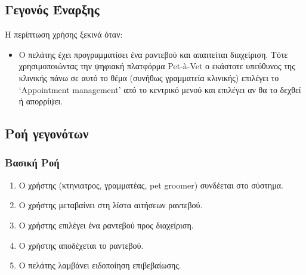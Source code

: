 \documentclass[12pt,a4paper,twoside]{book}
\begin{document}
\subsection{Γεγονός Έναρξης}
Η περίπτωση χρήσης ξεκινά όταν:
\begin{itemize}
  \item Ο πελάτης έχει προγραμματίσει ένα ραντεβού και απαιτείται διαχείριση. Τότε χρησιμοποιώντας την ψηφιακή πλατφόρμα  Pet-à-Vet ο εκάστοτε υπεύθυνος της κλινικής πάνω σε αυτό το θέμα (συνήθως γραμματεία κλινικής) επιλέγει το ‘Appointment management’ από το κεντρικό μενού και επιλέγει αν θα το δεχθεί ή απορρίψει. %
\end{itemize}

\subsection{Ροή γεγονότων}

\subsubsection{Βασική Ροή}
\begin{enumerate}
  \item Ο χρήστης (κτηνιατρος, γραμματέας, pet groomer) συνδέεται στο σύστημα. %
  \item Ο χρήστης μεταβαίνει στη λίστα αιτήσεων ραντεβού.
  \item Ο χρήστης επιλέγει ένα ραντεβού προς διαχείριση. %
  \item Ο χρήστης αποδέχεται το ραντεβού. %
  \item Ο πελάτης λαμβάνει ειδοποίηση επιβεβαίωσης.  %
\end{enumerate}
\end{document}
